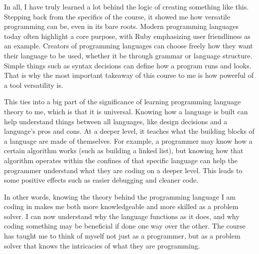 \documentclass{article}
\theoremstyle{theorem}
\theoremstyle{definition}
\theoremstyle{remark}
\begin{document}
In all, I have truly learned a lot behind the logic of creating something like this. Stepping back from the specifics of the course, it showed me how versatile programming can be, even in its bare roots. Modern programming languages today often highlight a core purpose, with Ruby emphasizing user friendliness as an example. Creators of programming languages can choose freely how they want their language to be used, whether it be through grammar or language structure. Simple things such as syntax decisions can define how a program runs and looks. That is why the most important takeaway of this course to me is how powerful of a tool versatility is. 

This ties into a big part of the significance of learning programming language theory to me, which is that it is universal. Knowing how a language is built can help understand things between all languages, like design decisions and a language’s pros and cons. At a deeper level, it teaches what the building blocks of a language are made of themselves. For example, a programmer may know how a certain algorithm works (such as building a linked list), but knowing how that algorithm operates within the confines of that specific language can help the programmer understand what they are coding on a deeper level. This leads to some positive effects such as easier debugging and cleaner code.

In other words, knowing the theory behind the programming language I am coding in makes me both more knowledgeable and more skilled as a problem solver. I can now understand why the language functions as it does, and why coding something may be beneficial if done one way over the other. The course has taught me to think of myself not just as a programmer, but as a problem solver that knows the intricacies of what they are programming.
\end{document}
